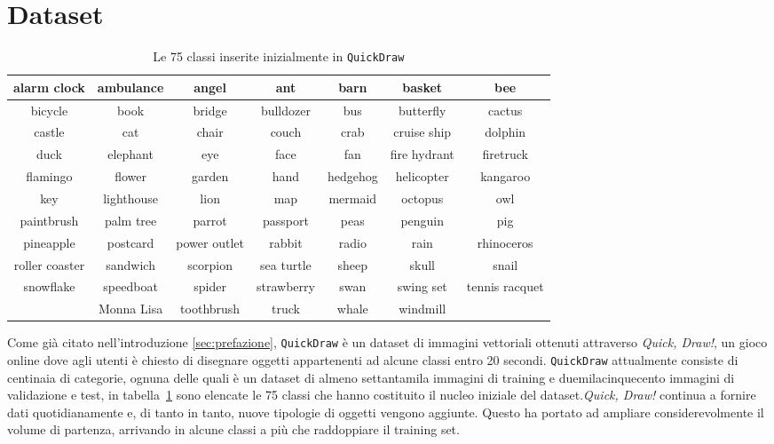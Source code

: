 \section{Dataset}
\label{sec:dataset}
\begin{table}[ht]\tiny
\centering
	\begin{tabular}{| c | c | c | c | c | c | c |}
		\hline
		alarm clock & ambulance & angel & ant & barn & basket & bee \\
		\hline
		bicycle & book & bridge & bulldozer & bus & butterfly & cactus \\
		\hline
		castle & cat & chair & couch & crab & cruise ship & dolphin \\
		\hline
		duck & elephant & eye & face & fan & fire hydrant & firetruck \\
		\hline
		flamingo & flower & garden & hand & hedgehog & helicopter & kangaroo \\
		\hline
		key & lighthouse & lion & map & mermaid & octopus & owl \\
		\hline
		paintbrush & palm tree & parrot & passport & peas & penguin & pig \\
		\hline
		pineapple & postcard & power outlet & rabbit & radio & rain & rhinoceros \\
		\hline
		roller coaster & sandwich & scorpion & sea turtle & sheep & skull & snail \\
		\hline
		snowflake & speedboat & spider & strawberry & swan & swing set & tennis racquet \\
		\hline
		& Monna Lisa & toothbrush & truck & whale & windmill & \\
		\hline
	\end{tabular}
	\caption{Le 75 classi inserite inizialmente in \texttt{QuickDraw}}
	\label{tab:1}
\end{table}
Come già citato nell'introduzione \ref{sec:prefazione}, \texttt{QuickDraw} è un dataset di immagini vettoriali ottenuti attraverso \textit{Quick, Draw!}\cite{quickdraw}, un gioco online dove agli utenti è chiesto di disegnare oggetti appartenenti ad alcune classi entro 20 secondi. \texttt{QuickDraw} attualmente consiste di centinaia di categorie, ognuna delle quali è un dataset di almeno settantamila immagini di training e duemilacinquecento immagini di validazione e test, in tabella~\ref{tab:1} sono elencate le 75 classi che hanno costituito il nucleo iniziale del dataset.\textit{Quick, Draw!} continua a fornire dati quotidianamente e, di tanto in tanto, nuove tipologie di oggetti vengono aggiunte. Questo ha portato ad ampliare considerevolmente il volume di partenza, arrivando in alcune classi a più che raddoppiare il training set.

